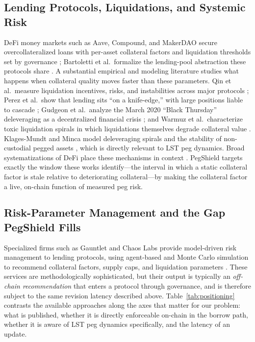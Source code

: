 \documentclass[aps,prx,reprint,nofootinbib,longbibliography]{revtex4-2}
\begin{document}
\subsection{Lending Protocols, Liquidations, and Systemic Risk}

DeFi money markets such as Aave, Compound, and MakerDAO secure overcollateralized
loans with per-asset collateral factors and liquidation thresholds set by
governance \cite{aave2024docs,compound2019whitepaper,makerdao_whitepaper}; Bartoletti
et al.\ formalize the lending-pool abstraction these protocols share
\cite{bartoletti2021soklending}. A substantial empirical and modeling literature
studies what happens when collateral quality moves faster than these parameters.
Qin et al.\ measure liquidation incentives, risks, and instabilities across major
protocols \cite{qin2021empirical}; Perez et al.\ show that lending sits ``on a
knife-edge,'' with large positions liable to cascade
\cite{perez2021knifeedge}; Gudgeon et al.\ analyze the March 2020 ``Black
Thursday'' deleveraging as a decentralized financial crisis
\cite{gudgeon2020crisis,gudgeon2020loanablefunds}; and Warmuz et al.\ characterize
toxic liquidation spirals in which liquidations themselves degrade collateral value
\cite{warmuz2022toxic}. Klages-Mundt and Minca model deleveraging spirals and the
stability of non-custodial pegged assets
\cite{klagesmundt2019instability,klagesmundt2020stability,klagesmundt2020stablecoins2},
which is directly relevant to LST peg dynamics. Broad systematizations of DeFi
place these mechanisms in context \cite{werner2022sok}. PegShield targets exactly
the window these works identify---the interval in which a static collateral factor
is stale relative to deteriorating collateral---by making the collateral factor a
live, on-chain function of measured peg risk.

\subsection{Risk-Parameter Management and the Gap PegShield Fills}

Specialized firms such as Gauntlet and Chaos Labs provide model-driven risk
management to lending protocols, using agent-based and Monte Carlo simulation to
recommend collateral factors, supply caps, and liquidation parameters
\cite{gauntlet_riskmethodology,chaoslabs_riskmethodology}. These services are
methodologically sophisticated, but their output is typically an
\emph{off-chain recommendation} that enters a protocol through governance, and is
therefore subject to the same revision latency described above. Table~\ref{tab:positioning}
contrasts the available approaches along the axes that matter for our problem:
what is published, whether it is directly enforceable on-chain in the borrow path,
whether it is aware of LST peg dynamics specifically, and the latency of an update.
\end{document}
